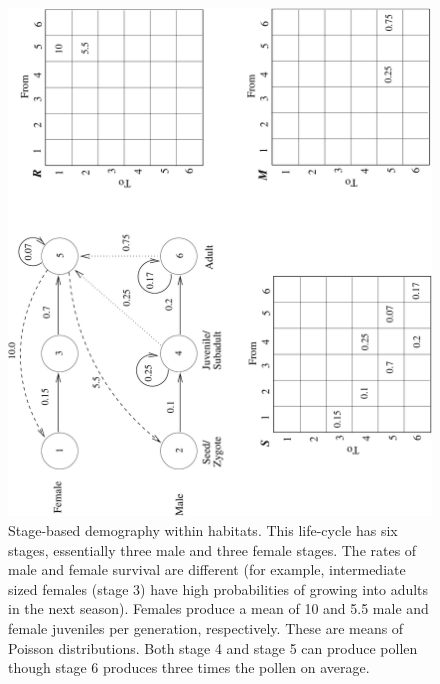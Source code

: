 \documentclass[10pt]{article}
\begin{document}
\begin{figure}
  \centering
  \includegraphics[angle=270]{demography.pdf}
  \caption{ Stage-based demography within habitats.  This life-cycle
    has six stages, essentially three male and three female stages.
    The rates of male and female survival are different (for example,
    intermediate sized females (stage 3) have high probabilities of
    growing into adults in the next season).  Females produce a mean of
    10 and 5.5 male and female juveniles per generation, respectively.
    These are means of Poisson distributions.  Both stage 4 and stage
    5 can produce pollen though stage 6 produces three times the
    pollen on average.}
  \label{fig:demogr}
\end{figure}
\end{document}
